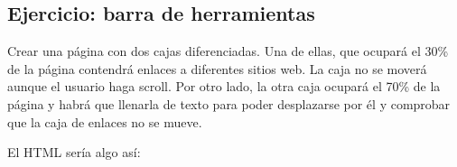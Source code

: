 \documentclass[letterpaper,10pt,spanish]{sphinxmanual}
\begin{document}
\begin{sphinxVerbatim}[commandchars=\\\{\}]
\end{sphinxVerbatim}


\subsection{Ejercicio: barra de herramientas}
\label{\detokenize{tema3:ejercicio-barra-de-herramientas}}
Crear una página con dos cajas diferenciadas. Una de ellas, que ocupará el 30\% de la página contendrá enlaces a diferentes sitios web. La caja no se moverá aunque el usuario haga scroll. Por  otro lado, la otra caja ocupará el 70\% de la página y habrá que llenarla de texto para poder desplazarse por él y comprobar que la caja de enlaces no se mueve.

El HTML sería algo así:
\end{document}
